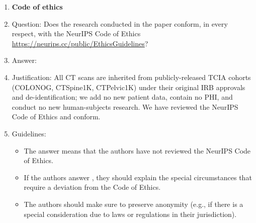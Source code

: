 \begin{enumerate}
\item {\bf Code of ethics}
    \item[] Question: Does the research conducted in the paper conform, in every respect, with the NeurIPS Code of Ethics \url{https://neurips.cc/public/EthicsGuidelines}?
    \item[] Answer: \answerYes{}
    \item[] Justification: All CT scans are inherited from publicly-released TCIA cohorts (COLONOG, CTSpine1K, CTPelvic1K) under their original IRB approvals and de-identification; we add no new patient data, contain no PHI, and conduct no new human-subjects research. We have reviewed the NeurIPS Code of Ethics and conform.
    \item[] Guidelines:
    \begin{itemize}
        \item The answer \answerNA{} means that the authors have not reviewed the NeurIPS Code of Ethics.
        \item If the authors answer \answerNo, they should explain the special circumstances that require a deviation from the Code of Ethics.
        \item The authors should make sure to preserve anonymity (e.g., if there is a special consideration due to laws or regulations in their jurisdiction).
    \end{itemize}



\end{enumerate}
